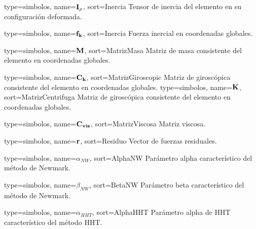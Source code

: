 {
	type={simbolos},
	name={$\bf{I_{\rho}}$}, %
	sort={Inercia} %
}
{Tensor de inercia del elemento en su configuración deformada.}

{
	type={simbolos},
	name={$\bf{f_k}$}, %
	sort={Inercia} %
}
{Fuerza inercial en coordenadas globales.}

{
	type={simbolos},
	name={$\bf{M}$}, %
	sort={MatrizMasa} %
}
{Matriz de masa consistente del elemento en coordenadas globales.}

{
	type={simbolos},
	name={$\bf{C}_k$}, %
	sort={MatrizGiroscopic} %
}
{Matriz de giroscópica consistente del elemento en coordenadas globales.}
{
	type={simbolos},
	name={$\bf{K}$}, %
	sort={MatrizCentrifuga} %
}
{Matriz de giroscópica consistente del elemento en coordenadas globales.}

{
	type={simbolos},
	name={$\bf{C}_{vis}$}, %
	sort={MatrizViscosa} %
}
{Matriz viscosa.}

{
	type={simbolos},
	name={$\bf{r}$}, %
	sort={Residuo} %
}
{Vector de fuerzas residuales.}

{
	type={simbolos},
	name={$\alpha_{NW}$}, %
	sort={AlphaNW} %
}
{Parámetro alpha característico del método de Newmark.}

{
	type={simbolos},
	name={$\beta_{NW}$}, %
	sort={BetaNW} %
}
{Parámetro beta característico del método de Newmark.}

{
	type={simbolos},
	name={$\alpha_{HHT}$}, %
	sort={AlphaHHT} %
}
{Parámetro alpha de HHT característico del método HHT.}

